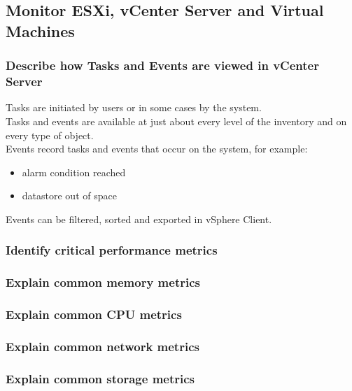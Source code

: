 \subsection{Monitor ESXi, vCenter Server and Virtual Machines}

\subsubsection{Describe how Tasks and Events are viewed in vCenter Server}

Tasks are initiated by users or in some cases by the system.\\

Tasks and events are available at just about every level of the inventory
and on every type of object.\\

Events record tasks and events that occur on the system, for example:

\begin{itemize}
\item alarm condition reached
\item datastore out of space
\end{itemize}

Events can be filtered, sorted and exported in vSphere Client.

\subsubsection{Identify critical performance metrics}

\subsubsection{Explain common memory metrics}

\subsubsection{Explain common CPU metrics}

\subsubsection{Explain common network metrics}

\subsubsection{Explain common storage metrics}


